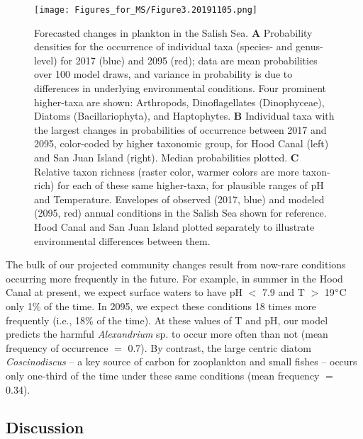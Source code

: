 \documentclass[11pt]{article}
\begin{document}
\begin{linenumbers}
 \begin{figure}
 \centering
 \texttt{[image: Figures\_for\_MS/Figure3.20191105.png]}
\caption{\footnotesize{Forecasted changes in plankton in the Salish Sea. \textbf{A} Probability densities for the occurrence of individual taxa (species- and genus-level) for 2017 (blue) and 2095 (red); data are mean probabilities over 100 model draws, and variance in probability is due to differences in underlying environmental conditions. Four prominent higher-taxa are shown: Arthropods, Dinoflagellates (Dinophyceae), Diatoms (Bacillariophyta), and Haptophytes.  \textbf{B} Individual taxa with the largest changes in probabilities of occurrence between 2017 and 2095, color-coded by higher taxonomic group, for Hood Canal (left) and San Juan Island (right). Median probabilities plotted. \textbf{C} Relative taxon richness (raster color, warmer colors are more taxon-rich) for each of these same higher-taxa, for plausible ranges of pH and Temperature. Envelopes of observed (2017, blue) and modeled (2095, red) annual conditions in the Salish Sea shown for reference. Hood Canal and San Juan Island plotted separately to illustrate environmental differences between them.}}

\label{fig:Fig3}
 \end{figure}
 
The bulk of our projected community changes result from now-rare conditions occurring more frequently in the future. For example, in summer in the Hood Canal at present, we expect surface waters to have pH $<$ 7.9 and T $>$ 19$\degree$C only 1\% of the time. In 2095, we expect these conditions 18 times more frequently (i.e., 18\% of the time). At these values of T and pH, our model predicts the harmful \textit{Alexandrium} sp. to occur more often than not (mean frequency of occurrence $=$ 0.7). By contrast, the large centric diatom \textit{Coscinodiscus} -- a key source of carbon for zooplankton and small fishes -- occurs only one-third of the time under these same conditions (mean frequency $=$ 0.34). 

\subsection*{Discussion}


\end{linenumbers}
\end{document}
